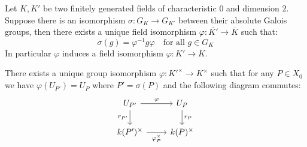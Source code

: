 \begin{theorem}\label{1.1}
Let $K,K'$ be two finitely generated fields of characteristic $0$ and dimension $2$. Suppose there is an isomorphism $\sigma:G_K\to G_{K'}$ between their absolute Galois groups, then there exists a unique field isomorphism $\varphi:\overline{K'}\to\overline{K}$ such that:
\[\sigma(g)=\varphi^{-1}g\varphi\quad \text{for all }g\in G_K\] 
In particular $\varphi$ induces a field isomorphism $\varphi:K'\to K$.
\end{theorem}

\begin{step}
There exists a unique group isomorphism $\varphi:K'^\times\to K^\times$ such that for any $P\in X_0$ we have $\varphi(U_{P'})=U_P$ where $P'=\sigma(P)$ and the following diagram commutes:
\[ \begin{tikzcd}
U_{P'} \ar[r, "\varphi"]\ar[d, "r_{P'}"'] & U_P \ar[d, "r_P"]\\
k(P')^\times \ar[r, "\varphi_P^\times"'] & k(P)^\times
\end{tikzcd} \]
\end{step}

